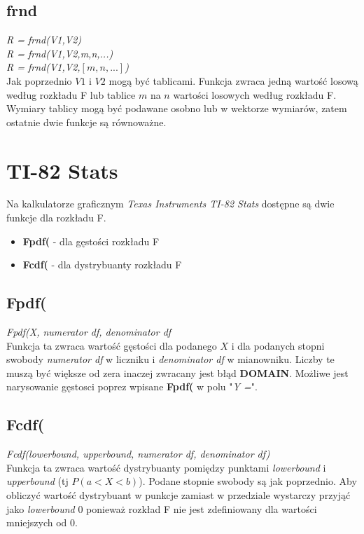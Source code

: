 \documentclass{article}
\begin{document}
\subsection{frnd}
\textit{R = frnd(V1,V2)} \\
\textit{R = frnd(V1,V2,m,n,...)}\\
\textit{R = frnd(V1,V2,$[m,n,...]$)} \\
Jak poprzednio $V1$ i $V2$ mogą być tablicami. Funkcja zwraca jedną wartość losową według rozkładu F lub tablice $m$ na $n$ wartości losowych według rozkładu F. Wymiary tablicy mogą być podawane osobno lub w wektorze wymiarów, zatem ostatnie dwie funkcje są równoważne.

\newpage
\section{TI-82 Stats}
Na kalkulatorze graficznym \textit{Texas Instruments TI-82 Stats} dostępne są dwie funkcje dla rozkładu F.
\begin{itemize}
\item \textbf{Fpdf(} - dla gęstości rozkładu F
\item \textbf{Fcdf(} - dla dystrybuanty rozkładu F
\end{itemize}
\subsection{Fpdf(}
\textit{Fpdf(X, numerator df, denominator df} \\
Funkcja ta zwraca wartość gęstości dla podanego $X$ i dla podanych stopni swobody \textit{numerator df} w liczniku i \textit{denominator df} w mianowniku. Liczby te muszą być większe od zera inaczej zwracany jest błąd \textbf{DOMAIN}. Możliwe jest narysowanie gęstosci poprez wpisane \textbf{Fpdf(} w polu "\textit{Y =}".

\subsection{Fcdf(}
\textit{Fcdf(lowerbound, upperbound, numerator df, denominator df)} \\
Funkcja ta zwraca wartość dystrybuanty pomiędzy punktami \textit{lowerbound} i \textit{upperbound} (tj $P(a<X<b)$). Podane stopnie swobody są jak poprzednio. Aby obliczyć wartość dystrybuant w punkcje zamiast w przedziale wystarczy przyjąć jako \textit{lowerbound} 0 ponieważ rozkład F nie jest zdefiniowany dla wartości mniejszych od 0.

\newpage
\end{document}
